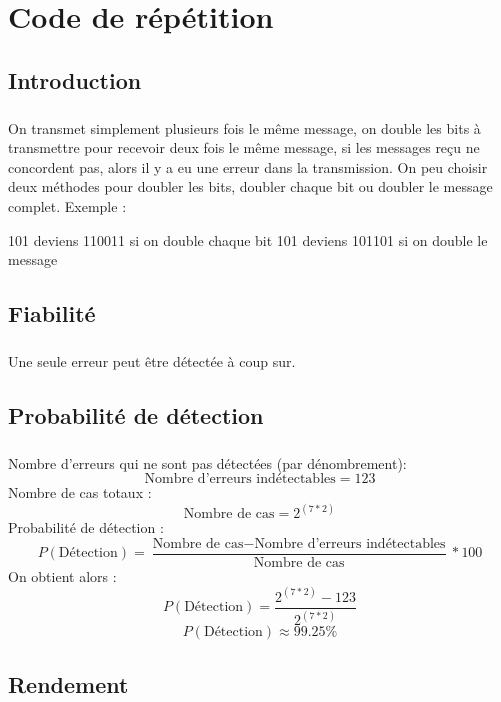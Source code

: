 
\chapter{Code de répétition}

    \section{Introduction}

        \paragraph{}
On transmet simplement plusieurs fois le même message, on double les bits à transmettre pour recevoir deux fois le même message, si les messages reçu ne concordent pas, alors il y a eu une erreur dans la transmission. On peu choisir deux méthodes pour doubler les bits, doubler chaque bit ou doubler le message complet. Exemple :

    101 deviens 110011 si on double chaque bit
    101 deviens 101101 si on double le message



    \section{Fiabilité}

        \paragraph{}
Une seule erreur peut être détectée à coup sur.


    \section{Probabilité de détection}

        \paragraph{}
Nombre d'erreurs qui ne sont pas détectées (par dénombrement):
\[  \text{Nombre d'erreurs indétectables} = 123 \]
Nombre de cas totaux :
\[  \text{Nombre de cas} = 2^{(7*2)} \]
Probabilité de détection :
\[  P(\text{Détection}) = \frac{\text{Nombre de cas} - \text{Nombre d'erreurs indétectables}}{\text{Nombre de cas}}*100 \]
On obtient alors :
\[  P(\text{Détection}) = \frac{2^{(7*2)} - 123}{2^{(7*2)}} \]
\[  P(\text{Détection}) \approx 99.25\% \]


    \section{Rendement}

